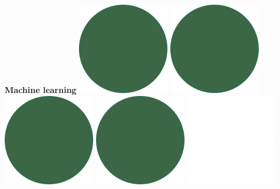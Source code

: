 \documentclass[]{commands}
\begin{document}
\begin{aside}
\textbf{Machine learning}\hfill
\includegraphics[scale=0.11]{img/IPSGreenDots.png}
\includegraphics[scale=0.11]{img/IPSGreenDots.png}
\includegraphics[scale=0.11]{img/IPSGreenDots.png}
\includegraphics[scale=0.11]{img/IPSGreenDots.png}
\includegraphics[scale=0.11]{img/WhiteDots.png}


\end{aside}
\end{document}
